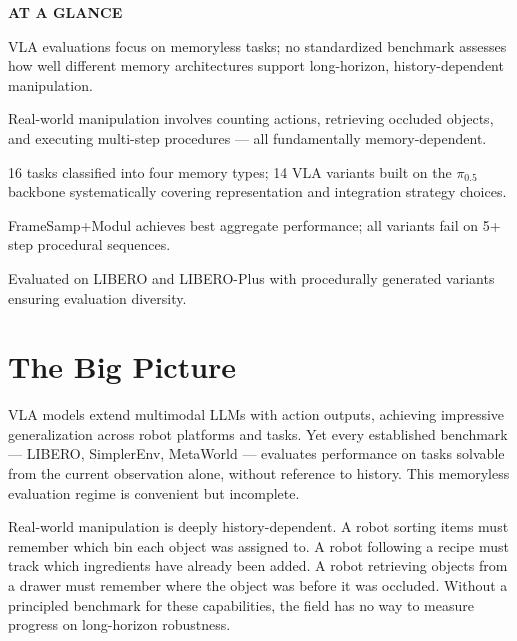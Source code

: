 \documentclass[10pt,twocolumn]{article}
\begin{document}
\begin{mdframed}[backgroundcolor=boxgray,linecolor=rulered,linewidth=1pt,
    innerleftmargin=6pt,innerrightmargin=6pt,
    innertopmargin=6pt,innerbottommargin=6pt]
\textbf{\small AT A GLANCE}\par\vspace{4pt}
\begin{description}[leftmargin=0pt,labelsep=4pt,itemsep=2pt,parsep=0pt,
    font=\small\bfseries]
  \item[Problem:] VLA evaluations focus on memoryless tasks; no standardized
    benchmark assesses how well different memory architectures support
    long-horizon, history-dependent manipulation.
  \item[Why it matters:] Real-world manipulation involves counting actions,
    retrieving occluded objects, and executing multi-step procedures ---
    all fundamentally memory-dependent.
  \item[Method:] 16 tasks classified into four memory types; 14 VLA variants
    built on the $\pi_{0.5}$ backbone systematically covering representation
    and integration strategy choices.
  \item[Result:] FrameSamp+Modul achieves best aggregate performance;
    all variants fail on 5+ step procedural sequences.
  \item[Evidence:] Evaluated on LIBERO and LIBERO-Plus with procedurally
    generated variants ensuring evaluation diversity.
\end{description}
\end{mdframed}

\section{The Big Picture}

VLA models extend multimodal LLMs with action outputs, achieving impressive
generalization across robot platforms and tasks. Yet every established
benchmark --- LIBERO, SimplerEnv, MetaWorld --- evaluates performance on tasks
solvable from the current observation alone, without reference to history. This
memoryless evaluation regime is convenient but incomplete.

Real-world manipulation is deeply history-dependent. A robot sorting items
must remember which bin each object was assigned to. A robot following a recipe
must track which ingredients have already been added. A robot retrieving objects
from a drawer must remember where the object was before it was occluded. Without
a principled benchmark for these capabilities, the field has no way to measure
progress on long-horizon robustness.
\end{document}
